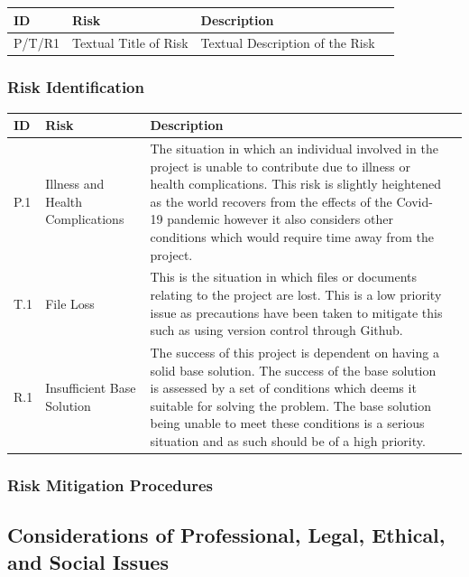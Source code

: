 \documentclass[12pt]{article}  %
\theoremstyle{definition}
\theoremstyle{remark}
\begin{document}
\begin{tabularx}{1.1\textwidth} {
	|  >{\center\arraybackslash}X
	| >{\center\arraybackslash}X
	| >{\center\arraybackslash}X
	| >{\center\arraybackslash} X | }
	\hline
	ID & Risk & Description \\
	\hline
	P/T/R1 & Textual Title of Risk & Textual Description of the Risk \\
	\hline
\end{tabularx}

\subsubsection {Risk Identification}

\begin{tabularx}{1.1\textwidth} {
	|  >{\center\arraybackslash}X
	| >{\center\arraybackslash}X
	| >{\center\arraybackslash}X
	| >{\center\arraybackslash} X | }
	\hline
	ID & Risk & Description \\
	\hline
	P.1 & Illness and Health Complications & The situation in which an individual involved in the project is unable to contribute due to illness or health complications. This risk is slightly heightened as the world recovers from the effects of the Covid-19 pandemic however it also considers other conditions which would require time away from the project. \\
	\hline
	T.1 & File Loss & This is the situation in which files or documents relating to the project are lost. This is a low priority issue as precautions have been taken to mitigate this such as using version control through Github. \\
	\hline
	R.1 & Insufficient Base Solution & The success of this project is dependent on having a solid base solution. The success of the base solution is assessed by a set of conditions which deems it suitable for solving the problem. The base solution being unable to meet these conditions is a serious situation and as such should be of a high priority. \\
	\hline
\end{tabularx}

\subsubsection {Risk Mitigation Procedures}

\subsection {Considerations of Professional, Legal, Ethical, and Social Issues}
\end{document}
